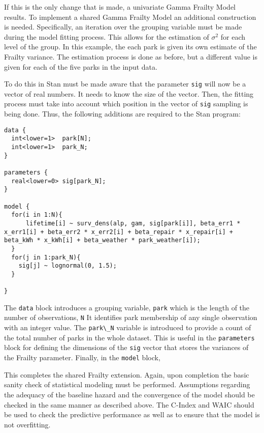 If this is the only change that is made, a univariate Gamma Frailty Model results. To implement a shared Gamma Frailty Model an additional construction is needed. Specifically, an iteration over the grouping variable must be made during the model fitting process. This allows for the estimation of $\sigma^2$ for each level of the group. In this example, the each park is given its own estimate of the Frailty variance. The estimation process is done as before, but a different value is given for each of the five parks in the input data.

To do this in Stan must be made aware that the parameter \lstinline{sig} will now be a vector of real numbers. It needs to know the size of the vector. Then, the fitting process must take into account which position in the vector of \lstinline{sig} sampling is being done. Thus, the following additions are required to the Stan program:


\begin{lstlisting}
data {
  int<lower=1>  park[N];
  int<lower=1>  park_N;
}

parameters {
  real<lower=0> sig[park_N];
}

model {
  for(i in 1:N){
      lifetime[i] ~ surv_dens(alp, gam, sig[park[i]], beta_err1 * x_err1[i] + beta_err2 * x_err2[i] + beta_repair * x_repair[i] + beta_kWh * x_kWh[i] + beta_weather * park_weather[i]);
  }
  for(j in 1:park_N){
    sig[j] ~ lognormal(0, 1.5);
  }

}
\end{lstlisting}


The \lstinline{data} block introduces a grouping variable, \lstinline{park} which is the length of the number of observations, \lstinline{N} It identifies  park membership of any single observation with an integer value. The \lstinline{park\_N} variable is introduced to provide a count of the total number of parks in the whole dataset. This is useful in the \lstinline{parameters} block for defining the dimensions of the \lstinline{sig} vector that stores the variances of the Frailty parameter. Finally, in the \lstinline{model} block, 

This completes the shared Frailty extension. Again, upon completion the basic sanity check of statistical modeling must be performed. Assumptions regarding the adequacy of the baseline hazard and the convergence of the model should be checked in the same manner as described above. The C-Index and WAIC should be used to check the predictive performance as well as to ensure that the model is not overfitting. 

